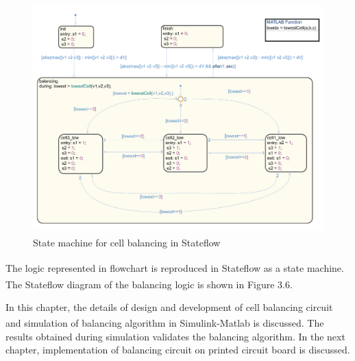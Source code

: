 \begin{figure}[H]
    \centering
    \includegraphics[scale = 0.6]{Chapter3/Figures/balancing logic.png}
    \caption{State machine for cell balancing in Stateflow\textsuperscript{\textregistered}}
\end{figure}


The logic represented in flowchart is reproduced in Stateflow\textsuperscript{\textregistered} as a state machine. The Stateflow\textsuperscript{\textregistered} diagram of the balancing logic is shown in Figure 3.6.

\vspace{1cm}

In this chapter, the details of design and development of cell balancing circuit and simulation of balancing algorithm in Simulink\textsuperscript{\textregistered}-Matlab\textsuperscript{\textregistered} is discussed. The results obtained during simulation validates the balancing algorithm. In the next chapter, implementation of balancing circuit on printed circuit board is discussed.